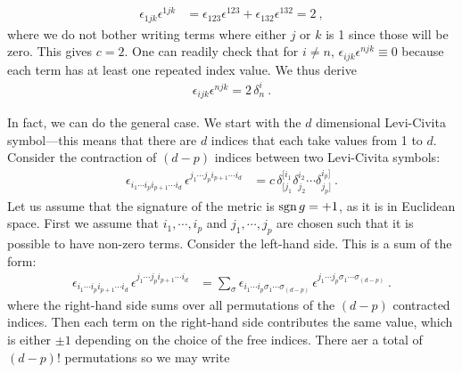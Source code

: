 \documentclass[12pt, oneside]{report}    %
\begin{document}
\begin{subappendices}
\begin{example}
\begin{align}
    \epsilon_{1jk}\epsilon^{1jk}
    &=
    \epsilon_{123}\epsilon^{123}
    +
    \epsilon_{132}\epsilon^{132}
    = 2 \ ,
\end{align}
where we do not bother writing terms where either $j$ or $k$ is 1 since those will be zero. This gives $c=2$. One can readily check that for $i\neq n$, $\epsilon_{ijk}\epsilon^{njk}\equiv 0$ because each term has at least one repeated index value. We thus derive 
\begin{align}
    \epsilon_{ijk}\epsilon^{njk} = 2\, \delta^i_n \ . 
\end{align}
\end{example}

In fact, we can do the general case. We start with the $d$ dimensional Levi-Civita symbol---this means that there are $d$ indices that each take values from 1 to $d$. Consider the contraction of $(d-p)$ indices between two Levi-Civita symbols:
\begin{align}
    \epsilon_{i_1\cdots i_p i_{p+1}\cdots i_d}\,
    \epsilon^{j_1\cdots j_p i_{p+1}\cdots i_d}
    &=
    c\, \delta^{[i_1}_{[j_1}\delta^{i_2}_{j_2} \cdots \delta^{i_p]}_{j_p]} \ .
    \label{eg:product:of:Levi:Civita:general}
\end{align}
Let us assume that the signature of the metric is $\operatorname{\textnormal{sgn}}{g}=+1$, as it is in Euclidean space. First we assume that $i_1, \cdots, i_p$ and $j_1, \cdots, j_p$ are chosen such that it is possible to have non-zero terms. Consider the left-hand side. This is a sum of the form:
\begin{align}
    \epsilon_{i_1\cdots i_p i_{p+1}\cdots i_d}\,
    \epsilon^{j_1\cdots j_p i_{p+1}\cdots i_d}
    &= 
    \sum_\sigma 
    \epsilon_{i_1\cdots i_p \sigma_1\cdots \sigma_{(d-p)}}\,
    \epsilon^{j_1\cdots j_p \sigma_1\cdots \sigma_{(d-p)}}
     \ .
\end{align}
where the right-hand side sums over all permutations of the $(d-p)$ contracted indices. Then each term on the right-hand side contributes the same value, which is either $\pm 1$ depending on the choice of the free indices. There aer a total of $(d-p)!$ permutations so we may write

\end{subappendices}
\end{document}
